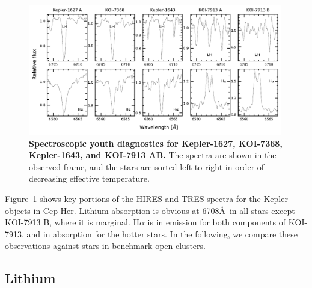 \documentclass[12pt,twocolumn]{aastex63}
\begin{document}
\begin{figure}[t]
	\begin{center}
		\leavevmode
			\includegraphics[width=0.99\textwidth]{f5.pdf}
	\end{center}
	\vspace{-0.3cm}
	\caption{
    {\bf Spectroscopic youth diagnostics for Kepler-1627, KOI-7368,
    Kepler-1643, and KOI-7913 AB. }
    The spectra are shown in the observed frame, and the stars are
    sorted left-to-right in order of decreasing effective temperature.
    \label{fig:koiyouthindicators}
	}
\end{figure}

Figure~\ref{fig:koiyouthindicators} shows key portions of the HIRES
and TRES spectra for the Kepler objects in Cep-Her.  Lithium
absorption is obvious at 6708\AA\ in all stars except KOI-7913 B,
where it is marginal.  H$\alpha$ is in emission for both components of
KOI-7913, and in absorption for the hotter stars.  In the following,
we compare these observations against stars in benchmark open
clusters.

\subsection{Lithium}
\end{document}
